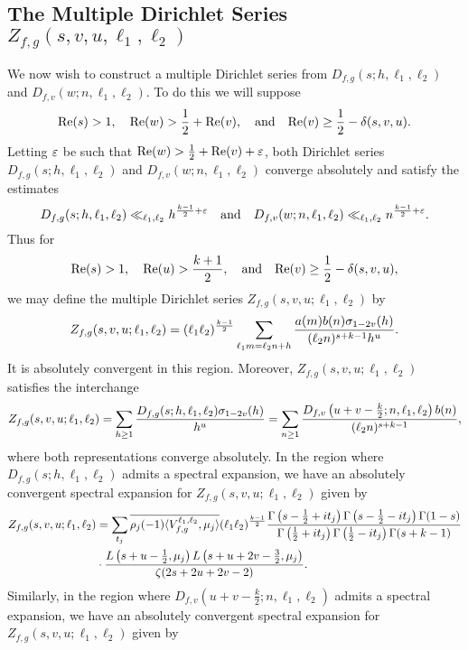 \documentclass[12pt,reqno,oneside]{amsart}
\begin{document}
  \subsection*{The Multiple Dirichlet Series \texorpdfstring{$Z_{f,g}(s,v,u,\ell_{1},\ell_{2})$}{}}
    We now wish to construct a multiple Dirichlet series from $D_{f,g}(s;h,\ell_{1},\ell_{2})$ and $D_{f,v}(w;n,\ell_{1},\ell_{2})$. To do this we will suppose 
    \[
      \mathrm{Re}(s) > 1, \quad \mathrm{Re}(w) > \frac{1}{2}+\mathrm{Re}(v), \quad \text{and} \quad \mathrm{Re}(v) \ge \frac{1}{2}-\delta(s,v,u).
    \]
    Letting $\varepsilon$ be such that $\mathrm{Re}(w) > \frac{1}{2}+\mathrm{Re}(v)+\varepsilon$, both Dirichlet series $D_{f,g}(s;h,\ell_{1},\ell_{2})$ and $D_{f,v}(w;n,\ell_{1},\ell_{2})$ converge absolutely and satisfy the estimates
    \[
      D_{f,g}(s;h,\ell_{1},\ell_{2}) \ll_{\ell_{1},\ell_{2}} h^{\frac{k-1}{2}+\varepsilon} \quad \text{and} \quad D_{f,v}(w;n,\ell_{1},\ell_{2}) \ll_{\ell_{1},\ell_{2}} n^{\frac{k-1}{2}+\varepsilon}.
    \]
    Thus for
    \[
      \mathrm{Re}(s) > 1, \quad \mathrm{Re}(u) > \frac{k+1}{2}, \quad \text{and} \quad \mathrm{Re}(v) \ge \frac{1}{2}-\delta(s,v,u),
    \]
    we may define the multiple Dirichlet series $Z_{f,g}(s,v,u;\ell_{1},\ell_{2})$ by
    \[
      Z_{f,g}(s,v,u;\ell_{1},\ell_{2}) = (\ell_{1}\ell_{2})^{\frac{k-1}{2}}\sum_{\ell_{1}m = \ell_{2}n+h}\frac{a(m)b(n)\sigma_{1-2v}(h)}{(\ell_{2}n)^{s+k-1}h^{u}}.
    \]
    It is absolutely convergent in this region. Moreover, $Z_{f,g}(s,v,u;\ell_{1},\ell_{2})$ satisfies the interchange
    \[
      Z_{f,g}(s,v,u;\ell_{1},\ell_{2}) = \sum_{h \ge 1}\frac{D_{f,g}(s;h,\ell_{1},\ell_{2})\sigma_{1-2v}(h)}{h^{u}} = \sum_{n \ge 1}\frac{D_{f,v}\left(u+v-\frac{k}{2};n,\ell_{1},\ell_{2}\right)b(n)}{(\ell_{2}n)^{s+k-1}},
    \]
    where both representations converge absolutely. In the region where $D_{f,g}(s;h,\ell_{1},\ell_{2})$ admits a spectral expansion, we have an absolutely convergent spectral expansion for $Z_{f,g}(s,v,u;\ell_{1},\ell_{2})$ given by
    \begin{align*}
      Z_{f,g}(s,v,u;\ell_{1},\ell_{2}) &= \sum_{t_{j}}\overline{\rho_{j}(-1)\langle V_{f,g}^{\ell_{1},\ell_{2}},\mu_{j}\rangle}(\ell_{1}\ell_{2})^{\frac{k-1}{2}}\frac{\Gamma\left(s-\frac{1}{2}+it_{j}\right)\Gamma\left(s-\frac{1}{2}-it_{j}\right)\Gamma(1-s)}{\Gamma\left(\frac{1}{2}+it_{j}\right)\Gamma\left(\frac{1}{2}-it_{j}\right)\Gamma(s+k-1)} \\
      &\cdot \frac{L\left(s+u-\frac{1}{2},\mu_{j}\right)L\left(s+u+2v-\frac{3}{2},\mu_{j}\right)}{\zeta(2s+2u+2v-2)}.
    \end{align*}
    Similarly, in the region where $D_{f,v}\left(u+v-\frac{k}{2};n,\ell_{1},\ell_{2}\right)$ admits a spectral expansion, we have an absolutely convergent spectral expansion for $Z_{f,g}(s,v,u;\ell_{1},\ell_{2})$ given by
\end{document}
